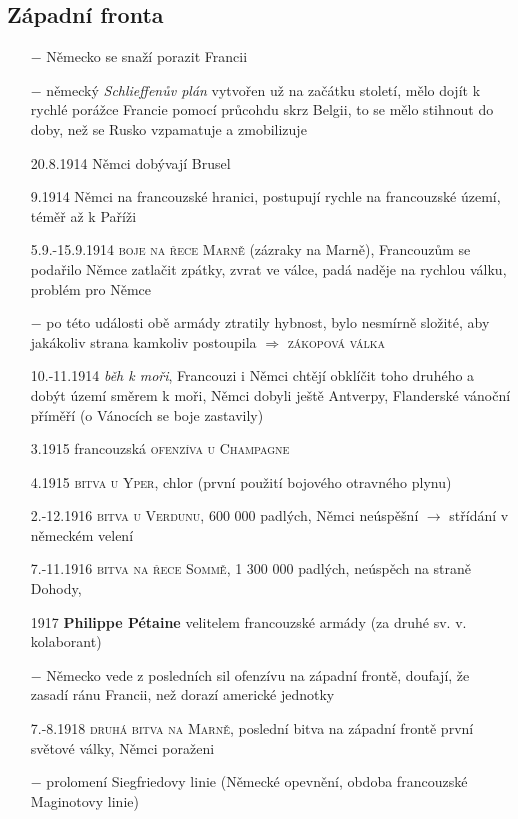 \documentclass{article}
\begin{document}
\subsection*{Západní fronta}
\begin{itemize}
    \vspace{-0.5em}
    \setlength\itemsep{0.15em}
    \item[$-$] Německo se snaží porazit Francii
    \item[$-$] německý \textit{Schlieffenův plán} vytvořen už na začátku století, mělo dojít k rychlé porážce Francie pomocí průcohdu skrz Belgii, to se mělo stihnout do doby, než se Rusko vzpamatuje a zmobilizuje
    \item[20.8.1914] Němci dobývají Brusel
    \item[9.1914] Němci na francouzské hranici, postupují rychle na francouzské území, téměř až k Paříži
    \item[5.9.-15.9.1914] \textsc{boje na řece Marně} (zázraky na Marně), Francouzům se podařilo Němce zatlačit zpátky, zvrat ve válce, padá naděje na rychlou válku, problém pro Němce
    \item[$-$] po této události obě armády ztratily hybnost, bylo nesmírně složité, aby jakákoliv strana kamkoliv postoupila $\Rightarrow$ \textsc{zákopová válka}
    \item[10.-11.1914] \textit{běh k moři}, Francouzi i Němci chtějí obklíčit toho druhého a dobýt území směrem k moři, Němci dobyli ještě Antverpy, Flanderské vánoční příměří (o Vánocích se boje zastavily)
    \item[3.1915] francouzská \textsc{ofenzíva u Champagne}
    \item[4.1915] \textsc{bitva u Yper}, chlor (první použití bojového otravného plynu)
    \item[2.-12.1916]  \textsc{bitva u Verdunu}, 600 000 padlých, Němci neúspěšní $\rightarrow$ střídání v německém velení
    \item[7.-11.1916] \textsc{bitva na řece Sommě}, 1 300 000 padlých, neúspěch na straně Dohody,
    \item[1917] \textbf{Philippe Pétaine} velitelem francouzské armády (za druhé sv. v. kolaborant)
    \item[$-$] Německo vede z posledních sil ofenzívu na západní frontě, doufají, že zasadí ránu Francii, než dorazí americké jednotky
    \item[7.-8.1918] \textsc{druhá bitva na Marně}, poslední bitva na západní frontě první světové války, Němci poraženi
    \item[$-$] prolomení Siegfriedovy linie (Německé opevnění, obdoba francouzské Maginotovy linie)
\end{itemize}
\end{document}
